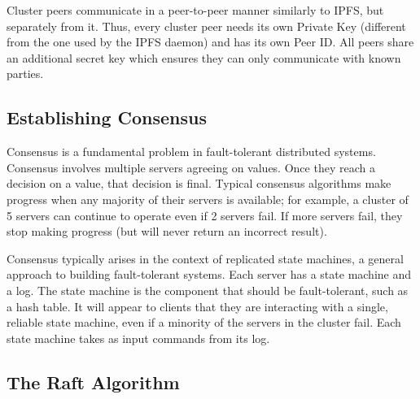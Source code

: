 \documentclass[12pt]{report}
\begin{document}
Cluster peers communicate in a peer-to-peer manner similarly to IPFS, but separately from it. Thus, every cluster peer needs its own Private Key (different from the one used by the IPFS daemon) and has its own Peer ID. All peers share an additional secret key which ensures they can only communicate with known parties.

\subsection{Establishing Consensus}

Consensus is a fundamental problem in fault-tolerant distributed systems. Consensus involves multiple servers agreeing on values. Once they reach a decision on a value, that decision is final. Typical consensus algorithms make progress when any majority of their servers is available; for example, a cluster of 5 servers can continue to operate even if 2 servers fail. If more servers fail, they stop making progress (but will never return an incorrect result).

Consensus typically arises in the context of replicated state machines, a general approach to building fault-tolerant systems. Each server has a state machine and a log. The state machine is the component that should be fault-tolerant, such as a hash table. It will appear to clients that they are interacting with a single, reliable state machine, even if a minority of the servers in the cluster fail. Each state machine takes as input commands from its log.

\subsection{The Raft Algorithm}
\end{document}
